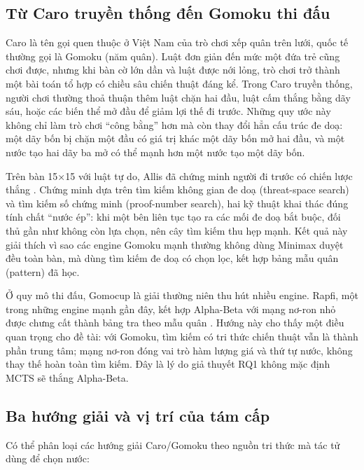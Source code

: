 \subsection{Từ Caro truyền thống đến Gomoku thi đấu}
Caro là tên gọi quen thuộc ở Việt Nam của trò chơi xếp quân trên lưới, quốc tế thường gọi là
Gomoku (năm quân). Luật đơn giản đến mức một đứa trẻ cũng chơi được, nhưng khi bàn cờ lớn dần
và luật được nới lỏng, trò chơi trở thành một bài toán tổ hợp có chiều sâu chiến thuật đáng kể.
Trong Caro truyền thống, người chơi thường thoả thuận thêm luật chặn hai đầu, luật cấm thắng
bằng dãy sáu, hoặc các biến thể mở đầu để giảm lợi thế đi trước. Những quy ước này không chỉ
làm trò chơi ``công bằng'' hơn mà còn thay đổi hẳn cấu trúc đe doạ: một dãy bốn bị chặn một
đầu có giá trị khác một dãy bốn mở hai đầu, và một nước tạo hai dãy ba mở có thể mạnh hơn một
nước tạo một dãy bốn.

Trên bàn 15×15 với luật tự do, Allis đã chứng minh người đi trước có chiến lược thắng
\cite{allis1994}. Chứng minh dựa trên tìm kiếm không gian đe doạ (threat-space search) và
tìm kiếm số chứng minh (proof-number search), hai kỹ thuật khai thác đúng tính chất ``nước ép'':
khi một bên liên tục tạo ra các mối đe doạ bắt buộc, đối thủ gần như không còn lựa chọn, nên
cây tìm kiếm thu hẹp mạnh. Kết quả này giải thích vì sao các engine Gomoku mạnh thường không
dùng Minimax duyệt đều toàn bàn, mà dùng tìm kiếm đe doạ có chọn lọc, kết hợp bảng mẫu quân
(pattern) đã học.

Ở quy mô thi đấu, Gomocup là giải thường niên thu hút nhiều engine. Rapfi, một trong những
engine mạnh gần đây, kết hợp Alpha-Beta với mạng nơ-ron nhỏ được chưng cất thành bảng tra theo
mẫu quân \cite{jin2025rapfi}. Hướng này cho thấy một điều quan trọng cho đề tài: với Gomoku,
tìm kiếm có tri thức chiến thuật vẫn là thành phần trung tâm; mạng nơ-ron đóng vai trò hàm lượng
giá và thứ tự nước, không thay thế hoàn toàn tìm kiếm. Đây là lý do giả thuyết RQ1 không mặc
định MCTS sẽ thắng Alpha-Beta.

\subsection{Ba hướng giải và vị trí của tám cấp}
Có thể phân loại các hướng giải Caro/Gomoku theo nguồn tri thức mà tác tử dùng để chọn nước:

